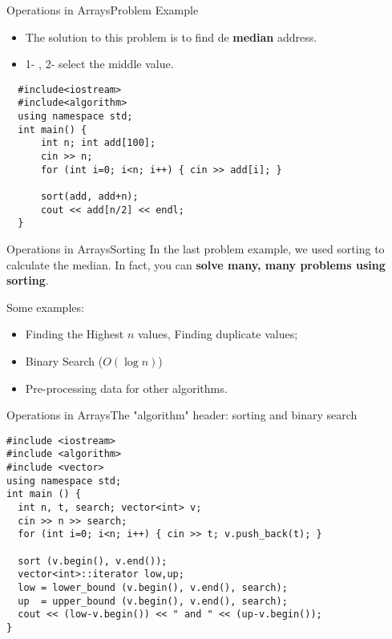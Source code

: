 \begin{frame}[fragile]{Operations in Arrays}{Problem Example}

  \begin{itemize}
  \item The solution to this problem is to find de {\bf median} address.
  \item 1- , 2- select the middle value.
  \end{itemize}

\begin{verbatim}
  #include<iostream>
  #include<algorithm>
  using namespace std;
  int main() {
      int n; int add[100];
      cin >> n;
      for (int i=0; i<n; i++) { cin >> add[i]; }

      sort(add, add+n);
      cout << add[n/2] << endl;
  }
\end{verbatim}
\end{frame}

\begin{frame}{Operations in Arrays}{Sorting}
  In the last problem example, we used sorting to calculate the median. In fact, you can {\bf solve many, many problems using sorting}.\bigskip

  Some examples:
  \begin{itemize}
  \item Finding the Highest $n$ values, Finding duplicate values;
    \bigskip

  \item Binary Search ($O(\log n)$)
    \bigskip

  \item Pre-processing data for other algorithms.
  \end{itemize}
\end{frame}

\begin{frame}[fragile]{Operations in Arrays}{The "algorithm" header: sorting and binary search}
{\small
\begin{block}{}
\begin{verbatim}
#include <iostream>
#include <algorithm>
#include <vector>
using namespace std;
int main () {
  int n, t, search; vector<int> v;
  cin >> n >> search;
  for (int i=0; i<n; i++) { cin >> t; v.push_back(t); }

  sort (v.begin(), v.end());
  vector<int>::iterator low,up;
  low = lower_bound (v.begin(), v.end(), search);
  up  = upper_bound (v.begin(), v.end(), search);
  cout << (low-v.begin()) << " and " << (up-v.begin());
}
\end{verbatim}
\end{block}}
\end{frame}


